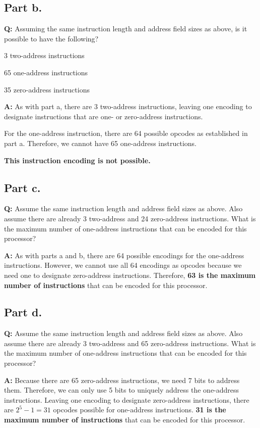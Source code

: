 \documentclass[a4paper]{article}
\begin{document}
  \subsection*{Part b.}
  \par \textbf{Q:}
  Assuming the same instruction length and address field sizes as above, is it
  possible to have the following?
  \begin{compactitem}
    \item 3 two-address instructions
    \item 65 one-address instructions
    \item 35 zero-address instructions
  \end{compactitem}
  \par \textbf{A:}
  As with part a, there are 3 two-address instructions, leaving one encoding
  to designate instructions that are one- or zero-address instructions.
  \par For the one-address instruction, there are 64 possible opcodes as
  established in part a.
  Therefore, we cannot have 65 one-address instructions.
  \par \textbf{This instruction encoding is not possible.}
  \subsection*{Part c.}
  \par \textbf{Q:}
  Assume the same instruction length and address field sizes as above.
  Also assume there are already 3 two-address and 24 zero-address instructions.
  What is the maximum number of one-address instructions that can be encoded
  for this processor?
  \par \textbf{A:}
  As with parts a and b, there are 64 possible encodings for the one-address
  instructions.
  However, we cannot use all 64 encodings as opcodes because we need one
  to designate zero-address instructions.
  Therefore, \textbf{63 is the maximum number of instructions} that can be
  encoded for this processor.
  \subsection*{Part d.}
  \par \textbf{Q:}
  Assume the same instruction length and address field sizes as above.
  Also assume there are already 3 two-address and 65 zero-address instructions.
  What is the maximum number of one-address instructions that can be encoded
  for this processor?
  \par \textbf{A:}
  Because there are 65 zero-address instructions, we need 7 bits to address
  them.
  Therefore, we can only use 5 bits to uniquely address the one-address
  instructions.
  Leaving one encoding to designate zero-address instructions, there are
  $2^5 - 1 = 31$ opcodes possible for one-address instructions.
  \textbf{31 is the maximum number of instructions} that can be encoded for
  this processor.
\end{document}
